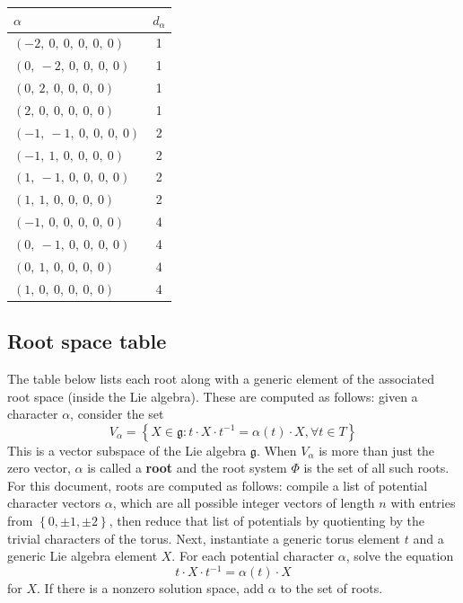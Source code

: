 \documentclass[11pt]{article}
\newcommand{\noi}{\noindent}
\newcommand{\tbf}{\textbf}
\newcommand{\inv}{^{-1}}
\newcommand{\lb}{\left\{}
\newcommand{\rb}{\right\}}
\newcommand{\frakg}{\mathfrak{g}}
\theoremstyle{definition}
\begin{document}
\noindent \begin{tabular}{|l|c|}
    \hline
    \textbf{$\alpha$} & \textbf{$d_{\alpha}$} \\
    \hline
    $\left( -2, \  0, \  0, \  0, \  0, \  0\right)$ & 1 \\
    \hline
    $\left( 0, \  -2, \  0, \  0, \  0, \  0\right)$ & 1 \\
    \hline
    $\left( 0, \  2, \  0, \  0, \  0, \  0\right)$ & 1 \\
    \hline
    $\left( 2, \  0, \  0, \  0, \  0, \  0\right)$ & 1 \\
    \hline
    $\left( -1, \  -1, \  0, \  0, \  0, \  0\right)$ & 2 \\
    \hline
    $\left( -1, \  1, \  0, \  0, \  0, \  0\right)$ & 2 \\
    \hline
    $\left( 1, \  -1, \  0, \  0, \  0, \  0\right)$ & 2 \\
    \hline
    $\left( 1, \  1, \  0, \  0, \  0, \  0\right)$ & 2 \\
    \hline
    $\left( -1, \  0, \  0, \  0, \  0, \  0\right)$ & 4 \\
    \hline
    $\left( 0, \  -1, \  0, \  0, \  0, \  0\right)$ & 4 \\
    \hline
    $\left( 0, \  1, \  0, \  0, \  0, \  0\right)$ & 4 \\
    \hline
    $\left( 1, \  0, \  0, \  0, \  0, \  0\right)$ & 4 \\
    \hline
\end{tabular}


\subsection{Root space table}

\noi The table below lists each root along with a generic element of the associated root space (inside the Lie algebra). These are computed as follows: given a character $\alpha$, consider the set
\[
	V_\alpha = \lb X \in \frakg : t \cdot X \cdot t \inv = \alpha(t) \cdot X, \forall t \in T \rb
\]
This is a vector subspace of the Lie algebra $\frakg$. When $V_\alpha$ is more than just the zero vector, $\alpha$ is called a \tbf{root} and the root system $\Phi$ is the set of all such roots. For this document, roots are computed as follows: compile a list of potential character vectors $\alpha$, which are all possible integer vectors of length $n$ with entries from $\lb 0, \pm 1, \pm 2 \rb$, then reduce that list of potentials by quotienting by the trivial characters of the torus. Next, instantiate a generic torus element $t$ and a generic Lie algebra element $X$. For each potential character $\alpha$, solve the equation
\[
	t \cdot X \cdot t \inv = \alpha(t) \cdot X
\]
for $X$. If there is a nonzero solution space, add $\alpha$ to the set of roots.
\end{document}

